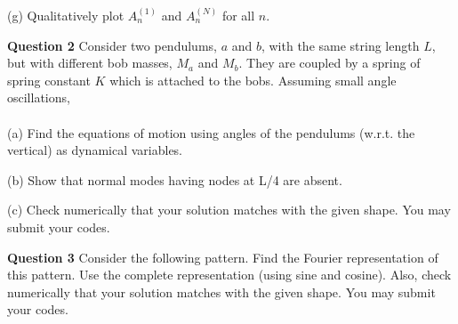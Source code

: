 \documentclass[addpoints]{exam}
\begin{document}
\begin{questions}
\begin{solution}
\end{solution}
(g) Qualitatively plot $A^{(1)}_n$ and $A^{(N)}_n$ for all $n$.
\begin{solution}
 
\end{solution}

\question\textbf{Question 2}
Consider two pendulums, $a$ and $b$, with the same string length $L$, but with different bob masses, $M_a$ and $M_b$. They are coupled by a spring of spring constant $K$ which 
is attached to the bobs. Assuming small angle oscillations, \\ \\ 
(a) Find the equations of motion using angles of the pendulums (w.r.t. the vertical) as dynamical variables.
\begin{solution}
 
\end{solution}
(b) Show that normal modes having nodes at L/4 are absent.
\begin{solution}
 
\end{solution}
(c) Check numerically that your solution matches with the given shape. You may submit
your codes.
\begin{solution}
 
\end{solution}

\question \textbf{ Question 3}
Consider the following pattern. Find the Fourier representation of this pattern. Use the
complete representation (using sine and cosine). Also, check numerically that your solution
matches with the given shape. You may submit your codes.
\begin{solution}
 
\end{solution}

\end{questions}
\end{document}
